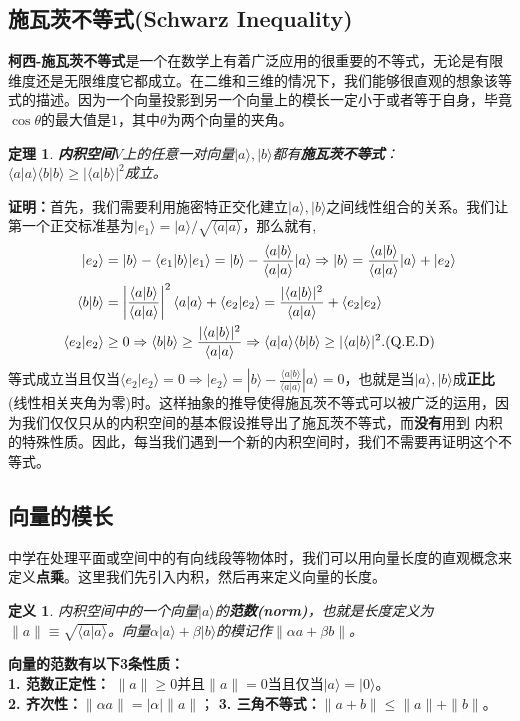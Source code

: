 \documentclass[mathserif,hyperref,UTF8,openany,b5paper]{ctexbook}
\newtheorem{defn}{定义}[section]
\newtheorem{thm}{定理}[section]
\begin{document}
\subsection{施瓦茨不等式(Schwarz Inequality)}
\textbf{柯西-施瓦茨不等式}是一个在数学上有着广泛应用的很重要的不等式，无论是有限维度还是无限维度它都成立。在二维和三维的情况下，我们能够很直观的想象该等式的描述。因为一个向量投影到另一个向量上的模长一定小于或者等于自身，毕竟$\cos \theta$的最大值是$1$，其中$\theta$为两个向量的夹角。
\begin{thm}
\textbf{内积空间}$V$上的任意一对向量$|a\rangle,|b\rangle$都有\textbf{施瓦茨不等式}：\\ $\langle a|a\rangle\langle b|b\rangle \geq |\langle a|b\rangle|^2$成立。
\end{thm}
\textbf{证明：}首先，我们需要利用施密特正交化建立$|a\rangle,|b\rangle$之间线性组合的关系。我们让第一个正交标准基为$|e_1\rangle=|a\rangle/\sqrt{\langle a|a\rangle}$，那么就有,
\begin{align}
|e_2\rangle &= |b\rangle - \langle e_1|b\rangle |e_1\rangle=|b\rangle - \frac{\langle a|b\rangle}{\langle a|a\rangle} |a\rangle \Rightarrow|b\rangle = \frac{\langle a|b\rangle}{\langle a|a\rangle} |a\rangle + |e_2\rangle \\
\langle b|b\rangle &= \left|\frac{\langle a|b\rangle}{\langle a|a\rangle} \right| ^2\langle a|a\rangle + \langle e_2|e_2\rangle = \frac{|\langle a|b\rangle|^2}{\langle a|a\rangle} + \langle e_2|e_2\rangle\\
\langle e_2|e_2\rangle &\geq 0 \Rightarrow \langle b|b\rangle\geq \frac{|\langle a|b\rangle|^2}{\langle a|a\rangle} \Rightarrow \langle a|a\rangle\langle b|b\rangle \geq |\langle a|b\rangle|^2. \rm(Q.E.D)
\end{align}等式成立当且仅当$\langle e_2|e_2\rangle = 0 \Rightarrow |e_2\rangle =|b\rangle - \frac{\langle a|b\rangle}{\langle a|a\rangle} |a\rangle = 0$，也就是当$|a\rangle,|b\rangle$成\textbf{正比}(线性相关夹角为零)时。这样抽象的推导使得施瓦茨不等式可以被广泛的运用，因为我们仅仅只从的内积空间的基本假设推导出了施瓦茨不等式，而\textbf{没有}用到
内积的特殊性质。因此，每当我们遇到一个新的内积空间时，我们不需要再证明这个不等式。
\subsection{向量的模长}
中学在处理平面或空间中的有向线段等物体时，我们可以用向量长度的直观概念来定义\textbf{点乘}。这里我们先引入内积，然后再来定义向量的长度。
\begin{defn}
内积空间中的一个向量$|a\rangle$的\textbf{范数(norm)}，也就是长度定义为$\|a\|\equiv \sqrt{\langle a|a\rangle}$。向量$\alpha|a\rangle +\beta|b\rangle$的模记作$\|\alpha a+
\beta b\|$。
\end{defn}
\textbf{向量的范数有以下3条性质：}\\
  \textbf{1. 范数正定性：} $\|a\|\geq 0$并且$\|a\|=0$当且仅当$|a\rangle = |0\rangle$。\\
  \textbf{2. 齐次性：}$\|\alpha a\|=|\alpha|\|a\|$； \textbf{3. 三角不等式：}$ \|a+b\|\leq \|a\|+\|b\|$。
\end{document}

